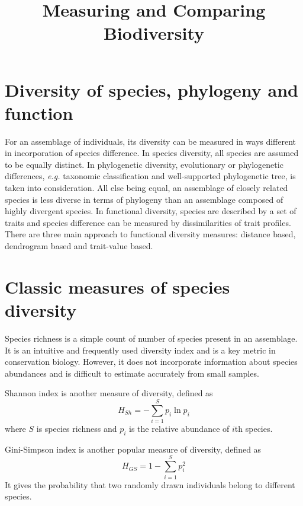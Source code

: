 \documentclass[11pt]{article}
\title{Measuring and Comparing Biodiversity}
\date{}
\begin{document}
  \maketitle

  \linenumbers

\section{Diversity of species, phylogeny and function}
For an assemblage of individuals, its diversity can be measured in ways different in incorporation of species difference. 
In species diversity, all species are assumed to be equally distinct. 
In phylogenetic diversity, evolutionary or phylogenetic differences, \textit{e.g.} taxonomic classification and well-supported phylogenetic tree, is taken into consideration. 
All else being equal, an assemblage of closely related species is less diverse in terms of phylogeny than an assemblage composed of highly divergent species. 
In functional diversity, species are described by a set of traits and species difference can be measured by dissimilarities of trait profiles. 
There are three main approach to functional diversity measures: distance based, dendrogram based and trait-value based.

\section{Classic measures of species diversity}
\label{SpeciesRichness}
Species richness is a simple count of number of species present in an assemblage. 
It is an intuitive and frequently used diversity index and is a key metric in conservation biology. 
However, it does not incorporate information about species abundances and is difficult to estimate accurately from small samples. 

\newline

Shannon index is another measure of diversity, defined as 
\begin{equation}
    H_{Sh} = -\sum\limits_{i=1}^{S}p_i \ln p_i
    \label{ShannonIndex}
\end{equation}
where $S$ is species richness and $p_i$ is the relative abundance of $i$th species.

\newline

Gini-Simpson index is another popular measure of diversity, defined as 
\begin{equation}
    H_{GS}=1-\sum\limits_{i=1}^{S}p_i^2
    \label{GiniSimpsonIndex}
\end{equation}
It gives the probability that two randomly drawn individuals belong to different species.
\end{document}
